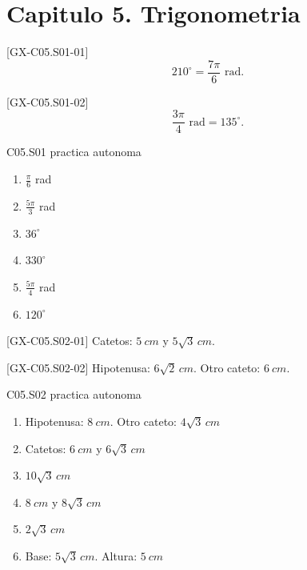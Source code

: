 \section*{Capitulo 5. Trigonometria}

\begin{shortanswer}{[GX-C05.S01-01]}
\[
210^\circ=\frac{7\pi}{6}\text{ rad}.
\]
\end{shortanswer}

\begin{shortanswer}{[GX-C05.S01-02]}
\[
\frac{3\pi}{4}\text{ rad}=135^\circ.
\]
\end{shortanswer}

\begin{shortanswer}{C05.S01 practica autonoma}
\begin{enumerate}[label=\textbf{PX-C05.S01-\arabic*:}, leftmargin=*]
  \item \(\frac{\pi}{6}\) rad
  \item \(\frac{5\pi}{3}\) rad
  \item \(36^\circ\)
  \item \(330^\circ\)
  \item \(\frac{5\pi}{4}\) rad
  \item \(120^\circ\)
\end{enumerate}
\end{shortanswer}

\begin{shortanswer}{[GX-C05.S02-01]}
Catetos: \(\SI{5}{cm}\) y \(5\sqrt{3}\,\si{cm}\).
\end{shortanswer}

\begin{shortanswer}{[GX-C05.S02-02]}
Hipotenusa: \(6\sqrt{2}\,\si{cm}\). Otro cateto: \(\SI{6}{cm}\).
\end{shortanswer}

\begin{shortanswer}{C05.S02 practica autonoma}
\begin{enumerate}[label=\textbf{PX-C05.S02-\arabic*:}, leftmargin=*]
  \item Hipotenusa: \(\SI{8}{cm}\). Otro cateto: \(4\sqrt{3}\,\si{cm}\)
  \item Catetos: \(\SI{6}{cm}\) y \(6\sqrt{3}\,\si{cm}\)
  \item \(10\sqrt{3}\,\si{cm}\)
  \item \(\SI{8}{cm}\) y \(8\sqrt{3}\,\si{cm}\)
  \item \(2\sqrt{3}\,\si{cm}\)
  \item Base: \(5\sqrt{3}\,\si{cm}\). Altura: \(\SI{5}{cm}\)
\end{enumerate}
\end{shortanswer}

